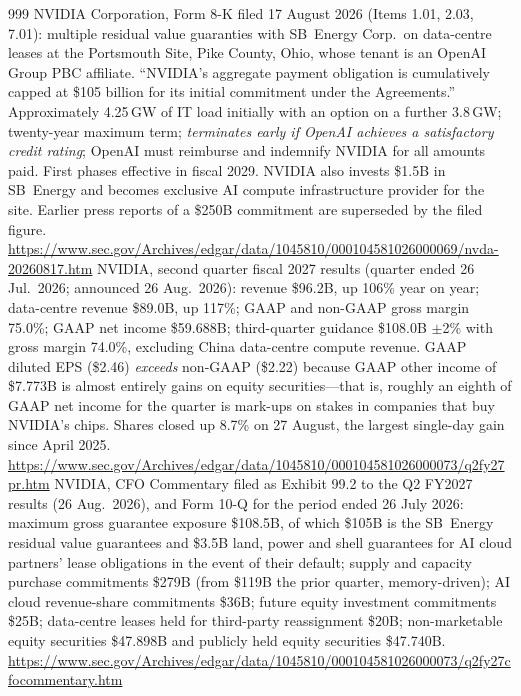 \begin{thebibliography}{999}
 NVIDIA Corporation, Form 8-K filed 17 August 2026 (Items 1.01, 2.03, 7.01): multiple residual value guaranties with SB~Energy Corp.\ on data-centre leases at the Portsmouth Site, Pike County, Ohio, whose tenant is an OpenAI Group PBC affiliate. ``NVIDIA's aggregate payment obligation is cumulatively capped at \$105 billion for its initial commitment under the Agreements.'' Approximately 4.25\,GW of IT load initially with an option on a further 3.8\,GW; twenty-year maximum term; \emph{terminates early if OpenAI achieves a satisfactory credit rating}; OpenAI must reimburse and indemnify NVIDIA for all amounts paid. First phases effective in fiscal 2029. NVIDIA also invests \$1.5B in SB~Energy and becomes exclusive AI compute infrastructure provider for the site. Earlier press reports of a \$250B commitment are superseded by the filed figure. \url{https://www.sec.gov/Archives/edgar/data/1045810/000104581026000069/nvda-20260817.htm}
 NVIDIA, second quarter fiscal 2027 results (quarter ended 26 Jul.\ 2026; announced 26 Aug.\ 2026): revenue \$96.2B, up 106\% year on year; data-centre revenue \$89.0B, up 117\%; GAAP and non-GAAP gross margin 75.0\%; GAAP net income \$59.688B; third-quarter guidance \$108.0B $\pm$2\% with gross margin 74.0\%, excluding China data-centre compute revenue. GAAP diluted EPS (\$2.46) \emph{exceeds} non-GAAP (\$2.22) because GAAP other income of \$7.773B is almost entirely gains on equity securities---that is, roughly an eighth of GAAP net income for the quarter is mark-ups on stakes in companies that buy NVIDIA's chips. Shares closed up 8.7\% on 27 August, the largest single-day gain since April 2025. \url{https://www.sec.gov/Archives/edgar/data/1045810/000104581026000073/q2fy27pr.htm}
 NVIDIA, CFO Commentary filed as Exhibit 99.2 to the Q2 FY2027 results (26 Aug.\ 2026), and Form 10-Q for the period ended 26 July 2026: maximum gross guarantee exposure \$108.5B, of which \$105B is the SB~Energy residual value guarantees and \$3.5B land, power and shell guarantees for AI cloud partners' lease obligations in the event of their default; supply and capacity purchase commitments \$279B (from \$119B the prior quarter, memory-driven); AI cloud revenue-share commitments \$36B; future equity investment commitments \$25B; data-centre leases held for third-party reassignment \$20B; non-marketable equity securities \$47.898B and publicly held equity securities \$47.740B. \url{https://www.sec.gov/Archives/edgar/data/1045810/000104581026000073/q2fy27cfocommentary.htm}

\end{thebibliography}
